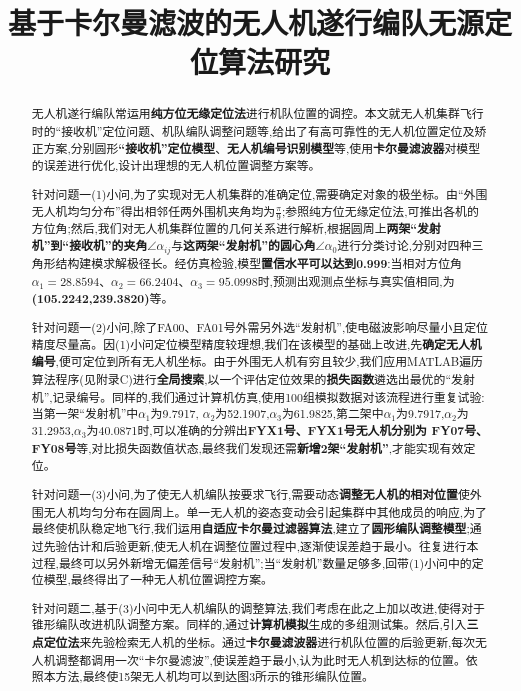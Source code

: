 \documentclass[withoutpreface,bwprint]{cumcmthesis} %
\title{基于卡尔曼滤波的无人机遂行编队无源定位算法研究}
\begin{document}
	\maketitle
	\begin{abstract}
		无人机遂行编队常运用\textbf{纯方位无缘定位法}进行机队位置的调控。本文就无人机集群飞行时的“接收机”定位问题、机队编队调整问题等,给出了有高可靠性的无人机位置定位及矫正方案,分别圆形\textbf{“接收机”定位模型}、\textbf{无人机编号识别模型}等,使用\textbf{卡尔曼滤波器}对模型的误差进行优化,设计出理想的无人机位置调整方案等。
		
		针对问题一(1)小问,为了实现对无人机集群的准确定位,需要确定对象的极坐标。由“外围无人机均匀分布”得出相邻任两外围机夹角均为$\frac{\pi}{9}$;参照纯方位无缘定位法,可推出各机的方位角;然后,我们对无人机集群位置的几何关系进行解析,根据圆周上\textbf{两架“发射机”到“接收机”的夹角$\angle \alpha_{ij}$}与\textbf{这两架“发射机”的圆心角$\angle \alpha_{0}$}进行分类讨论,分别对四种三角形结构建模求解极径长。经仿真检验,模型\textbf{置信水平可以达到0.999}:当相对方位角$\alpha_{1}=28.8594$、$\alpha_{2}=66.2404$、$\alpha_{3}=95.0998$时,预测出观测点坐标与真实值相同,为\textbf{(105.2242,239.3820\textdegree)}等。
		
		针对问题一(2)小问,除了FA00、FA01号外需另外选“发射机”,使电磁波影响尽量小且定位精度尽量高。因(1)小问定位模型精度较理想,我们在该模型的基础上改进,先\textbf{确定无人机编号},便可定位到所有无人机坐标。由于外围无人机有穷且较少,我们应用MATLAB遍历算法程序(见附录C)进行\textbf{全局搜索},以一个评估定位效果的\textbf{损失函数}遴选出最优的“发射机”,记录编号。同样的,我们通过计算机仿真,使用100组模拟数据对该流程进行重复试验:当第一架“发射机”中$\alpha_{1}$为9.7917,	$\alpha_{2}$为52.1907,$\alpha_{3}$为61.9825,第二架中$\alpha_{1}$为9.7917,$\alpha_{2}$为31.2953,$\alpha_{3}$为40.0871时,可以准确的分辨出\textbf{FYX1号、FYX1号无人机分别为 FY07号、FY08号}等,对比损失函数值状态,最终我们发现还需\textbf{新增2架“发射机”},才能实现有效定位。
			
		针对问题一(3)小问,为了使无人机编队按要求飞行,需要动态\textbf{调整无人机的相对位置}使外围无人机均匀分布在圆周上。单一无人机的姿态变动会引起集群中其他成员的响应,为了最终使机队稳定地飞行,我们运用\textbf{自适应卡尔曼过滤器算法},建立了\textbf{圆形编队调整模型};通过先验估计和后验更新,使无人机在调整位置过程中,逐渐使误差趋于最小。往复进行本过程,最终可以另外新增无偏差信号“发射机”;当“发射机”数量足够多,回带(1)小问中的定位模型,最终得出了一种无人机位置调控方案。
		
		针对问题二,基于(3)小问中无人机编队的调整算法,我们考虑在此之上加以改进,使得对于锥形编队改进机队调整方案。同样的,通过\textbf{计算机模拟}生成的多组测试集。然后,引入\textbf{三点定位法}来先验检索无人机的坐标。通过\textbf{卡尔曼滤波器}进行机队位置的后验更新,每次无人机调整都调用一次“卡尔曼滤波”,使误差趋于最小,认为此时无人机到达标的位置。依照本方法,最终使15架无人机均可以到达图3所示的锥形编队位置。
		
	\end{abstract}
	        \tableofcontents
\end{document}
